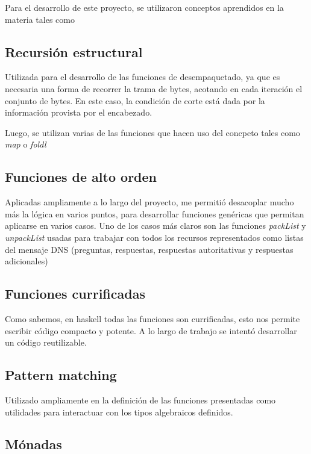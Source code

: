 \documentclass[6pt]{article}
\begin{document}
Para el desarrollo de este proyecto, se utilizaron conceptos aprendidos
en la materia tales como

\subsection{Recursión estructural}

Utilizada para el desarrollo de las funciones de desempaquetado, ya que
es necesaria una forma de recorrer la trama de bytes, acotando en
cada iteración el conjunto de bytes. En este caso, la condición de
corte está dada por la información provista por el encabezado.

Luego, se utilizan varias de las funciones que hacen uso del concpeto
tales como \textit{map} o \textit{foldl}

\subsection{Funciones de alto orden}

Aplicadas ampliamente a lo largo del proyecto, me permitió desacoplar
mucho más la lógica en varios puntos, para desarrollar funciones
genéricas que permitan aplicarse en varios casos. Uno de los casos
más claros son las funciones \textit{packList} y \textit{unpackList}
usadas para trabajar con todos los recursos representados como listas
del mensaje DNS (preguntas, respuestas, respuestas autoritativas
y respuestas adicionales)

\subsection{Funciones currificadas}

Como sabemos, en haskell todas las funciones son currificadas, esto nos
permite escribir código compacto y potente. A lo largo de trabajo se
intentó desarrollar un código reutilizable.

\subsection{Pattern matching}

Utilizado ampliamente en la definición de las funciones presentadas
como utilidades para interactuar con los tipos algebraicos definidos.

\subsection{Mónadas}
\end{document}
